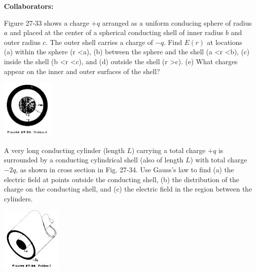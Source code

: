 \documentclass[11pt,letterpaper,boxed]{hmcpset}
\begin{document}
	
	\noindent\textbf{Collaborators:} 
	
	
	\begin{problem}[HRK P 27.4] 
		Figure 27-33 shows a charge $+q$ arranged as a uniform conducing sphere of radius $a$ and placed at the center of a spherical conducting shell of inner radius $b$ and outer radius $c$. The outer shell carries a charge of $-q$. Find $E(r)$ at locations (a) within the sphere (r \textless a), (b) between the sphere and the shell (a \textless r \textless b), (c) inside the shell (b \textless r \textless c), and (d) outside the shell (r \textgreater c). (e) What charges appear on the inner and outer surfaces of the shell?
		\begin{center}
		\includegraphics[scale=.7]{fig2733.jpg}
		\end{center}
		
	\end{problem}
	
	\begin{solution}
		\vfill
	\end{solution}
	\newpage

	\begin{problem}[HRK P27.5] 
A very long conducting cylinder (length $L$) carrying a total charge $+q$ is surrounded by a conducting cylindrical shell (also of length $L$) with total charge $-2q$, as shown in cross section in Fig. 27-34. Use Gauss's law to find (a) the electric field at points outside the conducting shell, (b) the distribution of the charge on the conducting shell, and (c) the electric field in the region between the cylinders.	
	\begin{center}
			\includegraphics[scale=.7]{fig2734.jpg}
	\end{center}
	\end{problem}
	\begin{solution}
		\vfill
	\end{solution}
	\newpage
\end{document}
